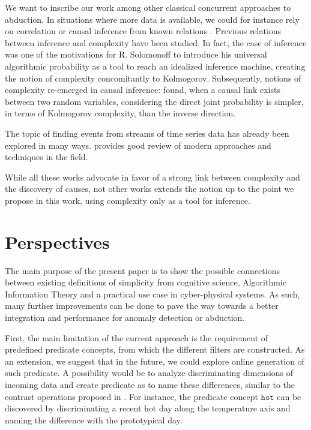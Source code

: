 \documentclass[conference]{IEEEtran}
\begin{document}
We want to inscribe our work among other classical concurrent approaches to 
abduction. In situations where more data is available, we could for instance rely
on correlation or causal inference from known relations \cite{peters_elements_2017,fadiga_or_2021}.
Previous relations between inference and complexity have been studied. In fact, the 
case of inference was one of the motivations for R. Solomonoff to introduce his 
universal algorithmic probability \cite{solomonoff_formal_1964} as a tool to 
reach an idealized inference machine, creating the notion of complexity concomitantly 
to Kolmogorov. Subsequently, notions of complexity re-emerged in causal inference: 
\cite{janzing_causal_2010} found, when a causal link exists between two random variables,
considering the direct joint probability is simpler, in terms of Kolmogorov complexity, 
than the inverse direction.

The topic of finding events from streams of time series data has already been explored in many ways. 
\cite{aggarwal_outlier_2017} provides good review of modern approaches and techniques
in the field.

While all these works advocate in favor of a strong link between complexity and the 
discovery of causes, not other works extends the notion up to the point we propose in this
work, using complexity only as a tool for inference. 

\section{Perspectives}
\label{sec:future}
The main purpose of the present paper is to show the possible connections
between existing definitions of simplicity from cognitive science, Algorithmic
Information Theory and a practical use case in cyber-physical systems. As such,
many further improvements can be done to pave the way towards a better
integration and performance for anomaly detection or abduction.

First, the main limitation of the current approach is the requirement of
predefined predicate concepts, from which the different filters are constructed.
As an extension, we suggest that in the future, we could explore online
generation of such predicate. A possibility would be to analyze discriminating
dimensions of incoming data and create predicate as to name these differences,
similar to the contrast operations proposed in \cite{dessalles_conceptual_2015,
  gardenfors2004conceptual}. For instance, the predicate concept $\mathtt{hot}$
can be discovered by discriminating a recent hot day along the
temperature axis and naming the difference with the prototypical day.
\end{document}
